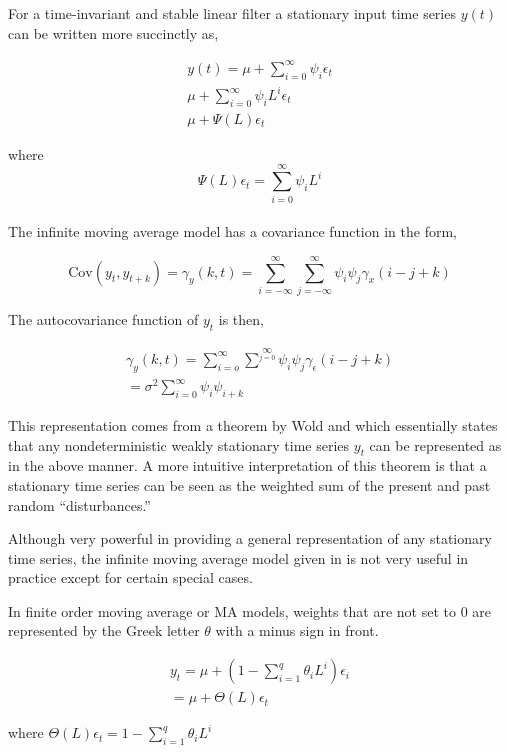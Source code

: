 \documentclass[
  11pt,
]{article}
\begin{document}
For a time-invariant and stable linear filter a stationary input time
series \(y(t)\) can be written more succinctly as,

\begin{gather*}
y(t) = \mu + \sum\limits_{i= 0}^{\infty}\psi_{i}\epsilon_{t} \\[8pt]
\mu + \sum\limits_{i=0}^{\infty}\psi_{i}L^{i}\epsilon_{t} \\[8pt]
\mu + \Psi(L)\epsilon_{t}
\end{gather*}

where \[
  \Psi(L)\epsilon_{t} = \sum\limits_{i=0}^{\infty}\psi_{i}L^{i}
  \]\\
The infinite moving average model has a covariance function in the form,

\[
\mathrm{Cov}(y_{t}, y_{t+k}) = \gamma_{y}(k, t) = \sum\limits_{i = -\infty}^{\infty}\sum\limits_{j = - \infty}^{\infty}\psi_{i}\psi_{j}\gamma_{x}(i - j + k)
\]

The autocovariance function of \(y_{t}\) is then,

\begin{gather*}
\gamma_{y}(k, t) = \sum\limits_{i = o}^{\infty}\sum^{\infty}\limits_{j = 0} \psi_{i}\psi_{j}\gamma_{\epsilon}(i-j+k) \\[8pt]
= \sigma^{2}\sum\limits_{i = 0}^{\infty}\psi_{i}\psi_{i + k}
\end{gather*}

This representation comes from a theorem by Wold and which essentially
states that any nondeterministic weakly stationary time series \(y_{t}\)
can be represented as in the above manner. A more intuitive
interpretation of this theorem is that a stationary time series can be
seen as the weighted sum of the present and past random
``disturbances.''

Although very powerful in providing a general representation of any
stationary time series, the infinite moving average model given in is
not very useful in practice except for certain special cases.

In finite order moving average or MA models, weights that are not set to
0 are represented by the Greek letter \(\theta\) with a minus sign in
front.

\begin{gather*}
y_{t} = \mu + \left(1 - \sum\limits_{i=1}^{q}\theta_{i}L^{i} \right)\epsilon_{i}\\[8pt]
= \mu + \Theta(L)\epsilon_{t}
\end{gather*}

where
\(\Theta(L)\epsilon_{t} = 1 - \sum\limits_{i=1}^{q}\theta_{i}L^{i}\)
\end{document}
